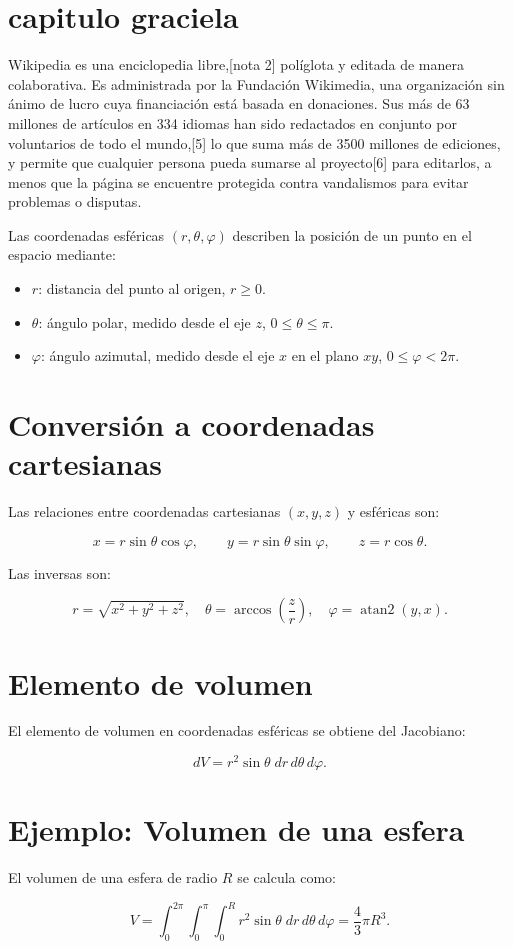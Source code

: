 \section{capitulo graciela}
Wikipedia es una enciclopedia libre,[nota 2]​ políglota y editada de manera colaborativa. Es administrada por la Fundación Wikimedia, una organización sin ánimo de lucro cuya financiación está basada en donaciones. Sus más de 63 millones de artículos en 334 idiomas han sido redactados en conjunto por voluntarios de todo el mundo,[5]​ lo que suma más de 3500 millones de ediciones, y permite que cualquier persona pueda sumarse al proyecto[6]​ para editarlos, a menos que la página se encuentre protegida contra vandalismos para evitar problemas o disputas.

Las coordenadas esféricas $(r, \theta, \varphi)$ describen la posición de un punto en el espacio mediante:

\begin{itemize}
    \item $r$: distancia del punto al origen, $r \ge 0$.
    \item $\theta$: ángulo polar, medido desde el eje $z$, $0 \le \theta \le \pi$.
    \item $\varphi$: ángulo azimutal, medido desde el eje $x$ en el plano $xy$, $0 \le \varphi < 2\pi$.
\end{itemize}

\section*{Conversión a coordenadas cartesianas}

Las relaciones entre coordenadas cartesianas $(x,y,z)$ y esféricas son:

\[
x = r \sin\theta \cos\varphi, \qquad
y = r \sin\theta \sin\varphi, \qquad
z = r \cos\theta.
\]

Las inversas son:

\[
r = \sqrt{x^2 + y^2 + z^2}, \quad
\theta = \arccos\left(\frac{z}{r}\right), \quad
\varphi = \operatorname{atan2}(y, x).
\]

\section*{Elemento de volumen}

El elemento de volumen en coordenadas esféricas se obtiene del Jacobiano:

\[
dV = r^2 \sin\theta \; dr \, d\theta \, d\varphi.
\]

\section*{Ejemplo: Volumen de una esfera}

El volumen de una esfera de radio $R$ se calcula como:

\[
V = \int_0^{2\pi}\int_0^{\pi}\int_0^R r^2 \sin\theta \; dr \, d\theta \, d\varphi
    = \frac{4}{3}\pi R^3.
\]